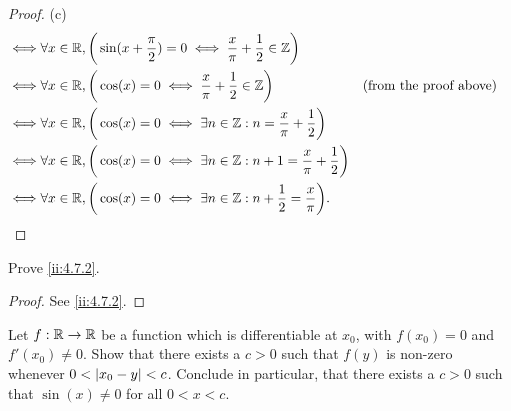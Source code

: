 \begin{proof}{(c)}
\begin{align*}
    \iff & \forall x \in \mathbb{R}, \bigg(\sin(x + \dfrac{\pi}{2}) = 0 \iff \dfrac{x}{\pi} + \dfrac{1}{2} \in \mathbb{Z}\bigg)                                       \\
    \iff & \forall x \in \mathbb{R}, \bigg(\cos(x) = 0 \iff \dfrac{x}{\pi} + \dfrac{1}{2} \in \mathbb{Z}\bigg)                     &  & \text{(from the proof above)} \\
    \iff & \forall x \in \mathbb{R}, \bigg(\cos(x) = 0 \iff \exists n \in \mathbb{Z} : n = \dfrac{x}{\pi} + \dfrac{1}{2}\bigg)                                        \\
    \iff & \forall x \in \mathbb{R}, \bigg(\cos(x) = 0 \iff \exists n \in \mathbb{Z} : n + 1 = \dfrac{x}{\pi} + \dfrac{1}{2}\bigg)                                    \\
    \iff & \forall x \in \mathbb{R}, \bigg(\cos(x) = 0 \iff \exists n \in \mathbb{Z} : n + \dfrac{1}{2} = \dfrac{x}{\pi}\bigg).
  \end{align*}
\end{proof}

\exercisesection

\begin{ex}\label{ii:ex:4.7.1}
  Prove \cref{ii:4.7.2}.
\end{ex}

\begin{proof}
  See \cref{ii:4.7.2}.
\end{proof}

\begin{ex}\label{ii:ex:4.7.2}
  Let \(f : \mathbb{R} \to \mathbb{R}\) be a function which is differentiable at \(x_0\), with \(f(x_0) = 0\) and \(f'(x_0) \neq 0\).
  Show that there exists a \(c > 0\) such that \(f(y)\) is non-zero whenever \(0 < \left\lvert x_0 - y\right\rvert < c\).
  Conclude in particular, that there exists a \(c > 0\) such that \(\sin(x) \neq 0\) for all \(0 < x < c\).
\end{ex}

